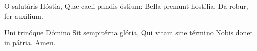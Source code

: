 O salutáris Hóstia,
Quæ caeli pandis óstium:
Bella premunt hostília,
Da robur, fer auxílium.

Uni trinóque Dómino
Sit sempitérna glória,
Qui vitam sine término
Nobis donet in pátria. Amen.